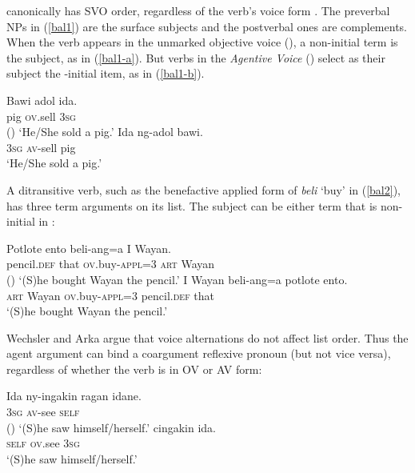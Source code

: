 \documentclass[output=paper
 	        ,biblatex
                ,babelshorthands
                ,newtxmath
                ,draftmode
                ,colorlinks, citecolor=brown
]{langscibook}
\begin{document}
 canonically has SVO order, regardless of the verb's voice form
\citep{Artawa1994, Wechsler+Arka:1998}.  The preverbal NPs in (\ref{bal1}) are the surface subjects
and the postverbal ones are complements.  When the verb appears in the unmarked objective voice
(), a non-initial term is the subject, as in (\ref{bal1-a}).  But verbs in the
\emph{Agentive Voice} () select as their subject the \argst{}-initial
item, as in (\ref{bal1-b}).

\begin{exe}
	\ex\label{bal1}
\begin{xlist}
\ex \label{bal1-a}	
\gll Bawi adol ida.  \\
     pig \textsc{ov}.sell \textsc{3sg}   \\\hfill()
\glt `He/She sold a pig.'
\ex\label{bal1-b}
\gll Ida ng-adol bawi.  \\
     \textsc{3sg} \textsc{av}-sell pig   \\
\glt `He/She sold a pig.'
\end{xlist}
\end{exe} 

\noindent
A ditransitive verb, such as the benefactive applied form of \textit{beli} `buy' in
(\ref{bal2}), has three term arguments on its \argst list.  The subject can be either term that is
non-initial in \argst{}:

\eal
\label{bal2}
\ex
\gll Potlote             ento beli-ang=a                      I            Wayan.  \\
     pencil.\textsc{def} that \textsc{ov}.buy-\textsc{appl}=3 \textsc{art} Wayan   \\\hfill()
\glt `(S)he bought Wayan the pencil.'
\ex
\gll I            Wayan beli-ang=a                      potlote             ento.   \\
     \textsc{art} Wayan \textsc{ov}.buy-\textsc{appl}=3 pencil.\textsc{def} that   \\
\glt `(S)he bought Wayan the pencil.'
\zl

\noindent
Wechsler and Arka argue that  voice alternations do not affect \argst
list order.  Thus the agent argument can bind a coargument reflexive pronoun (but not vice versa),
regardless of whether the verb is in OV or AV form:

\eal
\label{bal3}
\ex
\gll Ida          ny-ingakin      ragan idane. \\
     \textsc{3sg} \textsc{av}-see \textsc{self}\\\hfill()
\glt ‘(S)he saw himself/herself.’
\ex
{} cingakin        ida. \\
     \textsc{self} \textsc{ov}.see \textsc{3sg} \\
\glt ‘(S)he saw himself/herself.’
\zl
\end{document}
